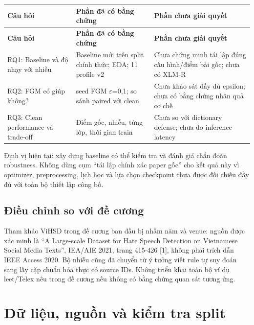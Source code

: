 \documentclass[11pt,a4paper]{article}
\newlength{\reporttablewidth}
\begin{document}
\begingroup
\small
\setlength{\tabcolsep}{4pt}
\setlength{\reporttablewidth}{\dimexpr\linewidth-4\tabcolsep\relax}
\renewcommand{\arraystretch}{1.15}
\begin{longtable}{@{}>{\raggedright\arraybackslash}p{0.23000\reporttablewidth}>{\raggedright\arraybackslash}p{0.39000\reporttablewidth}>{\raggedright\arraybackslash}p{0.38000\reporttablewidth}@{}}
\toprule
\textbf{Câu hỏi} & \textbf{Phần đã có bằng chứng} & \textbf{Phần chưa giải quyết} \\
\midrule
\endfirsthead
\toprule
\textbf{Câu hỏi} & \textbf{Phần đã có bằng chứng} & \textbf{Phần chưa giải quyết} \\
\midrule
\endhead
\bottomrule
\endlastfoot
RQ1: Baseline và độ nhạy với nhiễu & Baseline mới trên split chính thức; EDA; 11 profile v2 & Chưa chứng minh tái lập đúng cấu hình/điểm bài gốc; chưa có XLM-R \\
RQ2: FGM có giúp không? & 3 seed FGM \ensuremath{\varepsilon}=0,1; so sánh paired với clean & Chưa khảo sát đầy đủ epsilon; chưa có bằng chứng nhân quả cơ chế \\
RQ3: Clean performance và trade-off & Điểm gốc, nhiễu, từng lớp, thời gian train & Chưa so với dictionary defense; chưa đo inference latency \\
\end{longtable}
\endgroup

Định vị hiện tại: xây dựng baseline có thể kiểm tra và đánh giá chẩn đoán robustness. Không dùng cụm “tái lập chính xác paper gốc” cho kết quả này vì optimizer, preprocessing, lịch học và lựa chọn checkpoint chưa được đối chiếu đầy đủ với toàn bộ thiết lập công bố.


\subsection*{Điều chỉnh so với đề cương}

Tham khảo ViHSD trong đề cương ban đầu bị nhầm năm và venue: nguồn được xác minh là “A Large-scale Dataset for Hate Speech Detection on Vietnamese Social Media Texts”, IEA/AIE 2021, trang 415-426 [1], không phải trích dẫn IEEE Access 2020. Bộ nhiễu cũng đã chuyển từ ý tưởng viết rule tự suy đoán sang lấy cặp chuẩn hóa thực có source IDs. Không triển khai toàn bộ ví dụ leet/Telex nêu trong đề cương nếu không có bằng chứng quan sát tương ứng.


\FloatBarrier\section{Dữ liệu, nguồn và kiểm tra split}
\end{document}
